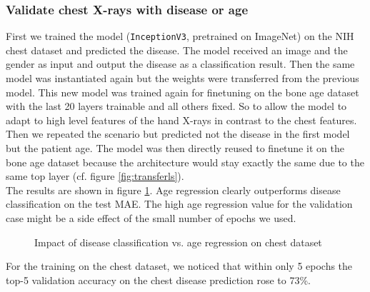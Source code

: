 \documentclass[10pt,twocolumn,letterpaper]{article}
\begin{document}
\subsubsection{Validate chest X-rays with disease or age}
First we trained the model (\verb+InceptionV3+, pretrained on ImageNet) on the NIH chest dataset and predicted the disease. The model received an image and the gender as input and output the disease as a classification result. Then the same model was instantiated again but the weights were transferred from the previous model. This new model was trained again for finetuning on the bone age dataset with the last 20 layers trainable and all others fixed. So to allow the model to adapt to high level features of the hand X-rays in contrast to the chest features.\\
Then we repeated the scenario but predicted not the disease in the first model but the patient age. The model was then directly reused to finetune it on the bone age dataset because the architecture would stay exactly the same due to the same top layer (cf. figure \ref{fig:transferls}).\\
The results are shown in figure \ref{fig:disease}. Age regression clearly outperforms disease classification on the test MAE. The high age regression value for the validation case might be a side effect of the small number of epochs we used.

\begin{figure}[H]
    \centering
{}
\caption{Impact of disease classification vs. age regression on chest dataset}
\label{fig:disease}
\end{figure}

For the training on the chest dataset, we noticed that within only 5 epochs the top-5 validation accuracy on the chest disease prediction rose to 73\%.
\end{document}
